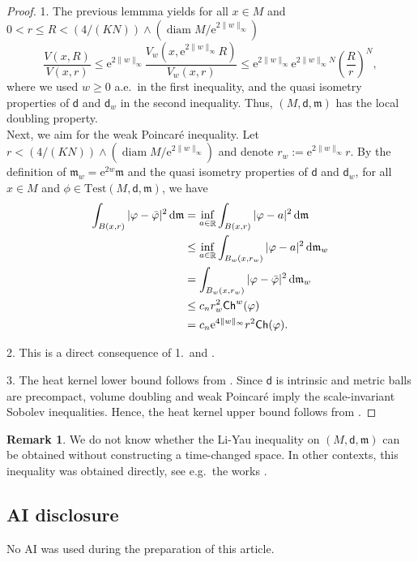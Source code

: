 \documentclass[10pt]{article}
\newcommand{\m}{\mathfrak{m}}
\newcommand{\M}{{\mathit{M}}}
\DeclareMathOperator{\diam}{diam}
\renewcommand{\d}{\,\mathrm{d}}
\newcommand{\Test}{\mathrm{Test}}
\newcommand{\e}{\mathrm{e}}
\newcommand{\dist}{\mathsf{d}}
\newcommand{\Ch}{{\sf Ch}}
\DeclareMathOperator{\RR}{\mathbb{R}}
\theoremstyle{plain}
\theoremstyle{definition}
\newtheorem{remark}[theorem]{Remark}
\begin{document}
\begin{proof}
 1. The previous lemmma yields for all $x\in\M$ and $0<r\leq R<(4/(KN))\wedge (\diam\M/\e^{2\|w\|_\infty})$
    \[
            \frac{V(x,R)}{V(x,r)}
           \leq \e^{2\|w\|_\infty}\frac{V_w(x,\e^{2\|w\|_\infty}R)}{V_w(x,r)}
           \leq \e^{2\|w\|_\infty}\e^{2\|w\|_\infty N}\left(\frac{R}{r}\right)^{N},
        \]
        where we used $w\geq 0$ a.e.~in the first inequality, and the quasi isometry properties of $\dist$ and $\dist_w$ in the second inequality. Thus, $(\M,\dist,\m)$ has the local doubling property. 
        \\
        Next, we aim for the weak Poincar\'e inequality. Let $r<(4/(KN))\wedge (\diam\M/\e^{2\|w\|_\infty})$
        and denote $r_w:=\e^{2\|w\|_\infty}r$. By the definition of $\m_w=\e^{2w}\m$ and the quasi isometry properties of $\dist$ and $\dist_w$, for all $x\in\M$ and $\phi\in\Test(\M,\dist,\m)$, we have
        \begin{align*}
            \int_{B(x,r)}|\varphi -\bar\varphi|^2\d\m
            & =
            \inf_{a\in\RR}\int_{B(x,r)}|\varphi -a|^2\d\m
           \\
           & \leq \inf_{a\in\RR}\int_{B_w(x,r_w)}|\varphi -a|^2\d\m_w\\
           & 
=\int_{B_w(x,r_w)}|\varphi -\bar\varphi|^2\d\m_w
\\
& \leq c_n r_w^2\Ch^w(\varphi)\\
& =c_n\e^{4\|w\|_\infty}r^2\Ch(\varphi).
        \end{align*}
    
2.  This is a direct consequence of 1.~and \cite[Theorem~3.5]{Sturm-96}.

3. The heat kernel lower bound follows from \cite[Theorem~4.8]{Sturm-96}. Since $\dist$ is intrinsic and metric balls are precompact, volume doubling and weak Poincar\'e imply the scale-invariant Sobolev inequalities. Hence, the heat kernel upper bound follows from \cite[Theorem~2.4]{Sturm95_II}.
\end{proof}

\begin{remark} We do not know whether the Li-Yau inequality on $(\M,\dist,\m)$ can be obtained without constructing a time-changed space. In other contexts, this inequality was obtained directly, see e.g.~the works \cite{BaudoinGarofalo,GarofaloMondino-13, BBG17,Rose19,Carron-19}.
\end{remark}

\subsection*{AI disclosure}

No AI was used during the preparation of this article.






\end{document}
